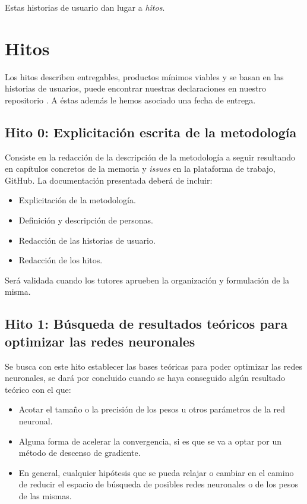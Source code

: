 
Estas historias de usuario dan lugar a \textit{hitos}. 

\section{Hitos}  

Los hitos describen entregables, productos mínimos viables y se basan en las historias de usuarios,
puede encontrar nuestras declaraciones en nuestro repositorio \cite{TFG-Estudio-de-las-redes-neuronales-milestones}. 
A éstas además le hemos asociado una fecha de entrega. 


\subsection*{Hito 0: Explicitación escrita de la metodología} 
Consiste en la redacción de la descripción de la metodología a seguir resultando en capítulos concretos de la memoria 
y \textit{issues} en la plataforma de trabajo, GitHub.  
La documentación presentada deberá de incluir: 
\begin{itemize}
    \item Explicitación de la metodología. 
    \item Definición y descripción de personas.
    \item Redacción de las historias de usuario.
    \item Redacción de los hitos.
\end{itemize}
Será validada cuando los tutores aprueben la organización y formulación de la misma.


\subsection*{Hito 1: Búsqueda de resultados teóricos para optimizar  las redes neuronales}

Se busca con este hito establecer las bases teóricas para poder optimizar las redes neuronales, se dará por concluido cuando se haya conseguido algún resultado teórico con el que:
\begin{itemize}
    \item Acotar el tamaño o la precisión de los pesos u otros parámetros de la red neuronal.
    \item Alguna forma de acelerar la convergencia, si es que se va a optar por un método de descenso de gradiente.
    \item En general, cualquier hipótesis que se pueda relajar o cambiar en el camino de reducir el espacio de búsqueda de posibles redes neuronales o de los pesos de las mismas.
\end{itemize}

